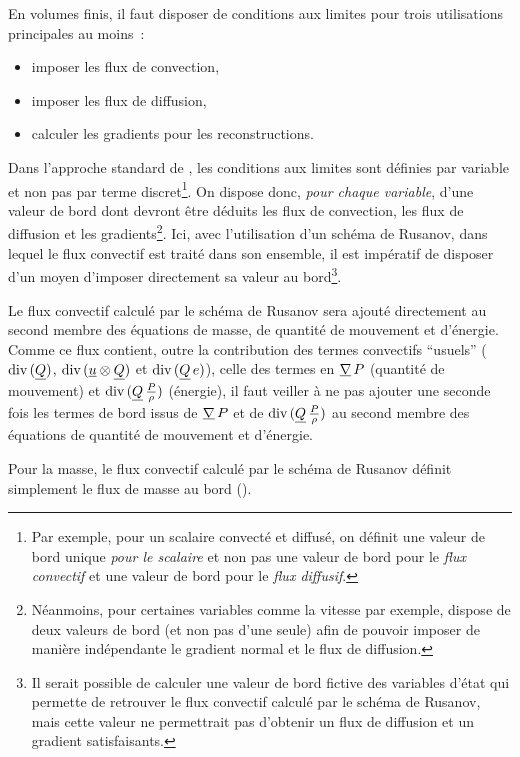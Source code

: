 En volumes finis, il faut disposer de conditions aux
limites pour trois utilisations principales au moins~:
         \begin{itemize}
        \item imposer les flux de convection,
        \item imposer les flux de diffusion,
        \item calculer les gradients pour les reconstructions.
        \end{itemize}
Dans l'approche standard de \CS, les conditions aux limites sont définies par
variable et non pas par terme discret\footnote{Par exemple, pour un scalaire
convecté et diffusé, on définit une valeur de bord unique {\it pour le scalaire}
et non pas une valeur de bord pour le {\it flux convectif} et une valeur de bord
pour le {\it flux diffusif}.}. On dispose donc, {\it pour chaque variable},
d'une valeur de bord dont devront être déduits les flux de
convection, les flux de diffusion et les gradients\footnote{Néanmoins, pour
certaines variables comme la vitesse par exemple, \CS dispose de deux valeurs
de bord (et non pas d'une seule) afin de pouvoir imposer de manière
indépendante le gradient normal et le flux de diffusion.}.
Ici, avec l'utilisation d'un schéma de
Rusanov, dans lequel le flux convectif est traité dans son ensemble,
il est impératif
de disposer d'un moyen d'imposer directement sa valeur au bord\footnote{Il
serait possible de calculer une valeur de bord fictive des variables d'état qui
permette de retrouver le flux convectif calculé par le schéma de Rusanov,
mais cette valeur ne permettrait pas d'obtenir
un flux de diffusion et un gradient satisfaisants.}.

Le flux convectif calculé par le schéma de Rusanov
sera ajouté directement au second membre
des équations de masse, de quantité de mouvement et d'énergie. Comme ce
flux contient, outre la contribution des termes convectifs ``usuels''
($\text{div}\,(\underline{Q})$, $\text{div}\,(\underline{u}\otimes\underline{Q})$ et
$\text{div}\,(\underline{Q}\,e)$), celle des termes en $\underline{\nabla}\,P$ (quantité de
mouvement) et $\text{div}\,(\underline{Q}\,\frac{P}{\rho})$
(énergie), il faut veiller à ne pas
ajouter une seconde fois les termes de bord issus de  $\underline{\nabla}\,P$ et de
$\text{div}\,(\underline{Q}\,\frac{P}{\rho})$
au second membre des équations de quantité de
mouvement et d'énergie.


Pour la masse, le flux convectif calculé par le schéma de Rusanov
définit simplement le flux de masse au bord
().

